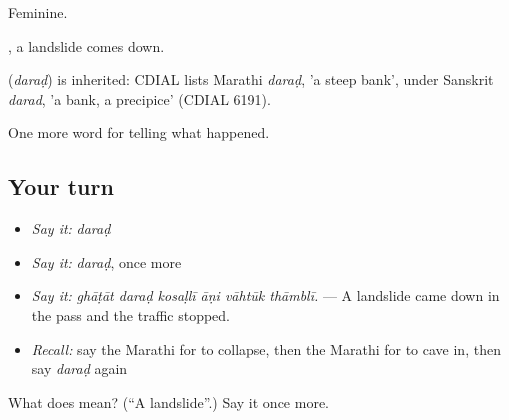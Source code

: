 Feminine.

 , a landslide comes down.

\begin{cousinweb}
\textbf{} (\emph{daraḍ}) is inherited: CDIAL lists Marathi \emph{daraḍ}, 'a steep bank', under Sanskrit \emph{darad}, 'a bank, a precipice' (CDIAL 6191).
\end{cousinweb}

\begin{grammarlens}[title={What you've built}]
One more word for telling what happened.
\end{grammarlens}

\subsection*{Your turn}
\begin{itemize}
\raggedright
  \item \emph{Say it:} \emph{daraḍ}
  \item \emph{Say it:} \emph{daraḍ}, once more
  \item \emph{Say it:} \emph{ghāṭāt daraḍ kosaḷlī āṇi vāhtūk thāmblī.} — A landslide came down in the pass and the traffic stopped.
  \item \emph{Recall:} say the Marathi for to collapse, then the Marathi for to cave in, then say \emph{daraḍ} again
\end{itemize}

\begin{tcolorbox}[breakable,colback=teal!4,colframe=teal!35!black,title={Before you move on}]
What does  mean? (\textquotedblleft{}A landslide\textquotedblright{}.) Say it once more.
\end{tcolorbox}

